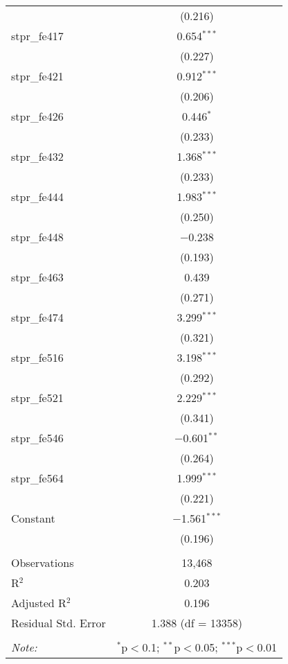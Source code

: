 \begin{table}[!htbp]
\begin{tabular}{@{\extracolsep{5pt}}lc}
  & (0.216) \\ 
  stpr\_fe417 & 0.654$^{***}$ \\ 
  & (0.227) \\ 
  stpr\_fe421 & 0.912$^{***}$ \\ 
  & (0.206) \\ 
  stpr\_fe426 & 0.446$^{*}$ \\ 
  & (0.233) \\ 
  stpr\_fe432 & 1.368$^{***}$ \\ 
  & (0.233) \\ 
  stpr\_fe444 & 1.983$^{***}$ \\ 
  & (0.250) \\ 
  stpr\_fe448 & $-$0.238 \\ 
  & (0.193) \\ 
  stpr\_fe463 & 0.439 \\ 
  & (0.271) \\ 
  stpr\_fe474 & 3.299$^{***}$ \\ 
  & (0.321) \\ 
  stpr\_fe516 & 3.198$^{***}$ \\ 
  & (0.292) \\ 
  stpr\_fe521 & 2.229$^{***}$ \\ 
  & (0.341) \\ 
  stpr\_fe546 & $-$0.601$^{**}$ \\ 
  & (0.264) \\ 
  stpr\_fe564 & 1.999$^{***}$ \\ 
  & (0.221) \\ 
  Constant & $-$1.561$^{***}$ \\ 
  & (0.196) \\ 
 \hline \\[-1.8ex] 
Observations & 13,468 \\ 
R$^{2}$ & 0.203 \\ 
Adjusted R$^{2}$ & 0.196 \\ 
Residual Std. Error & 1.388 (df = 13358) \\ 
\hline 
\hline \\[-1.8ex] 
\textit{Note:}  & \multicolumn{1}{r}{$^{*}$p$<$0.1; $^{**}$p$<$0.05; $^{***}$p$<$0.01} \\ 
\end{tabular} 
\end{table} 
